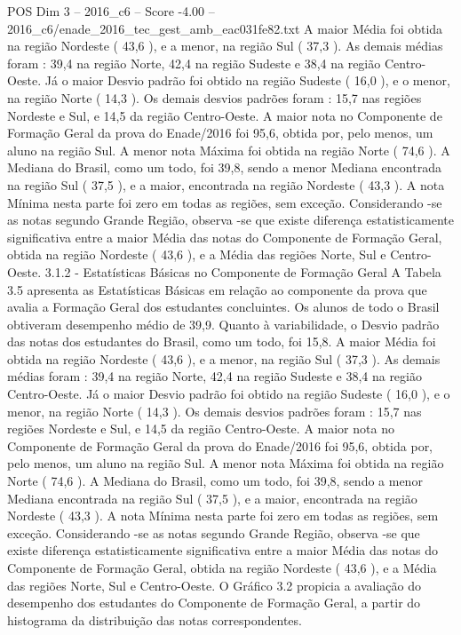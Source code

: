 \begin{textsample}{POS Dim 3 – 2016\_c6 – Score -4.00 – 2016\_c6/enade\_2016\_tec\_gest\_amb\_eac031fe82.txt}
A maior Média foi obtida na região Nordeste ( 43,6 ), e a menor, na região Sul ( 37,3 ).
As demais médias foram : 39,4 na região Norte, 42,4 na região Sudeste e 38,4 na região Centro-Oeste.
Já o maior Desvio padrão foi obtido na região Sudeste ( 16,0 ), e o menor, na região Norte ( 14,3 ).
Os demais desvios padrões foram : 15,7 nas regiões Nordeste e Sul, e 14,5 da região Centro-Oeste.
A maior nota no Componente de Formação Geral da prova do Enade/2016 foi 95,6, obtida por, pelo menos, um aluno na região Sul.
A menor nota Máxima foi obtida na região Norte ( 74,6 ).
A Mediana do Brasil, como um todo, foi 39,8, sendo a menor Mediana encontrada na região Sul ( 37,5 ), e a maior, encontrada na região Nordeste ( 43,3 ).
A nota Mínima nesta parte foi zero em todas as regiões, sem exceção.
Considerando -se as notas segundo Grande Região, observa -se que existe diferença estatisticamente significativa entre a maior Média das notas do Componente de Formação Geral, obtida na região Nordeste ( 43,6 ), e a Média das regiões Norte, Sul e Centro-Oeste. 3.1.2 - Estatísticas Básicas no Componente de Formação Geral A Tabela 3.5 apresenta as Estatísticas Básicas em relação ao componente da prova que avalia a Formação Geral dos estudantes concluintes.
Os alunos de todo o Brasil obtiveram desempenho médio de 39,9.
Quanto à variabilidade, o Desvio padrão das notas dos estudantes do Brasil, como um todo, foi 15,8.
A maior Média foi obtida na região Nordeste ( 43,6 ), e a menor, na região Sul ( 37,3 ).
As demais médias foram : 39,4 na região Norte, 42,4 na região Sudeste e 38,4 na região Centro-Oeste.
Já o maior Desvio padrão foi obtido na região Sudeste ( 16,0 ), e o menor, na região Norte ( 14,3 ).
Os demais desvios padrões foram : 15,7 nas regiões Nordeste e Sul, e 14,5 da região Centro-Oeste.
A maior nota no Componente de Formação Geral da prova do Enade/2016 foi 95,6, obtida por, pelo menos, um aluno na região Sul.
A menor nota Máxima foi obtida na região Norte ( 74,6 ).
A Mediana do Brasil, como um todo, foi 39,8, sendo a menor Mediana encontrada na região Sul ( 37,5 ), e a maior, encontrada na região Nordeste ( 43,3 ).
A nota Mínima nesta parte foi zero em todas as regiões, sem exceção.
Considerando -se as notas segundo Grande Região, observa -se que existe diferença estatisticamente significativa entre a maior Média das notas do Componente de Formação Geral, obtida na região Nordeste ( 43,6 ), e a Média das regiões Norte, Sul e Centro-Oeste.
O Gráfico 3.2 propicia a avaliação do desempenho dos estudantes do Componente de Formação Geral, a partir do histograma da distribuição das notas correspondentes.

\end{textsample}
